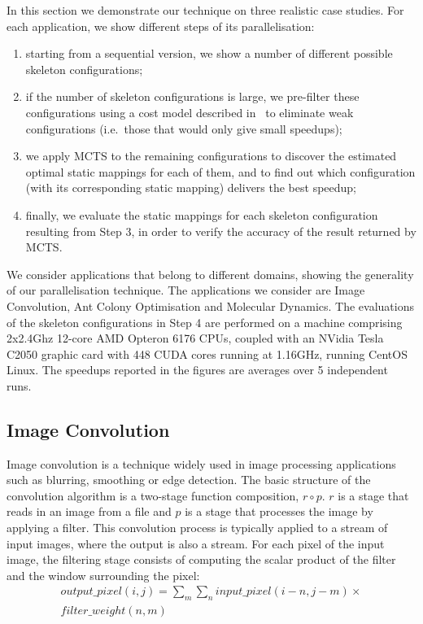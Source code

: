 \documentclass[smallextended]{svjour3}
\begin{document}
\noindent
In this section we demonstrate our technique on three
realistic case studies. For each application, we show different steps of
its parallelisation: 
\begin{enumerate}
\item starting from a sequential version, we
show a number of different possible skeleton configurations; 
\item if the number of skeleton configurations is
  large, we pre-filter these configurations using a cost model
described in~\cite{hlpp} to eliminate weak configurations
(i.e.\ those that would only give small speedups); 
\item we apply MCTS to the remaining configurations to discover the estimated optimal 
static mappings for each of them, and to find out which configuration
(with its corresponding static mapping) delivers the best speedup;
\item  finally, we evaluate the static mappings for each skeleton
configuration resulting from Step 3, in order to
verify the accuracy of the result returned by MCTS.
\end{enumerate} 

\noindent
We consider applications that belong to different domains, showing the
generality of our parallelisation technique. The applications we consider are
Image Convolution, Ant Colony
Optimisation and Molecular Dynamics. The evaluations of the skeleton
configurations in Step 4 are performed on a machine comprising 2x2.4Ghz 12-core 
AMD Opteron 6176 CPUs, coupled with an NVidia Tesla C2050 graphic card
with 448 CUDA cores running at 1.16GHz, running CentOS Linux. The speedups reported in the figures are
averages over 5 independent runs.


\subsection{Image Convolution}
\label{sec:imageConv}
\noindent
Image convolution is a technique widely used in image processing applications such as blurring, smoothing
or edge detection. 
The basic structure of the convolution algorithm is a two-stage function composition, $ r \circ p $.
$r$ is a stage that reads in an image from a file and $p$ is a stage
that processes the image by applying a filter. This
convolution process is typically applied to a stream of input images,
where the output is also a stream.
For each pixel of the input image, the filtering stage consists of computing the scalar product of the
filter and the window surrounding the pixel:
\begin{multline}
\label{eqn:01}
output\_pixel(i,j)=\sum_{m}\sum_{n} input\_pixel(i-n,j-m)\times\\
filter\_weight(n,m){}
\end{multline}
\end{document}
